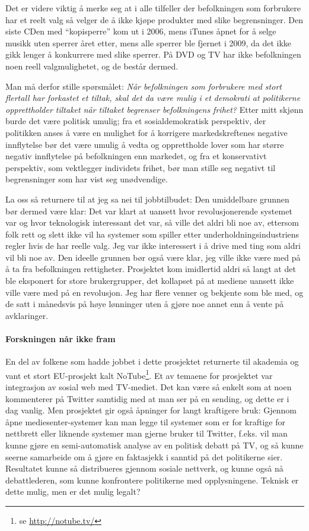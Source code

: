 \documentclass[11pt,norsk,a4paper]{article}
\begin{document}
Det er videre viktig å merke seg at i alle tilfeller der befolkningen
som forbrukere har et reelt valg så velger de å ikke kjøpe produkter
med slike begrensninger. Den siste CDen med ``kopisperre'' kom ut i
2006\cite{aftkopi}, mens iTunes åpnet for å selge musikk uten sperrer året etter,
mens alle sperrer ble fjernet i 2009\cite{ituneskopi}, da det ikke gikk lenger å
konkurrere med slike sperrer. På DVD og TV har
ikke befolkningen noen reell valgmulighetet, og de består dermed.

Man må derfor stille spørsmålet: \emph{Når befolkningen som forbrukere med
stort flertall har forkastet et tiltak, skal det da være mulig i et
demokrati at politikerne opprettholder tiltaket når tiltaket begrenser
befolkningens frihet?} Etter mitt skjønn burde det være politisk
umulig; fra et sosialdemokratisk perspektiv, der politikken anses å
være en mulighet for å korrigere markedskreftenes negative innflytelse
bør det være umulig å vedta og opprettholde lover som har større
negativ innflytelse på befolkningen enn markedet, og fra et
konservativt perspektiv, som vektlegger individets frihet, bør man
stille seg negativt til begrensninger som har vist seg unødvendige.

La oss så returnere til at jeg sa nei til jobbtilbudet: Den
umiddelbare grunnen bør dermed være klar: Det var klart at uansett
hvor revolusjonerende systemet var og hvor teknologisk interessant det
var, så ville det aldri bli noe av, ettersom folk rett og slett ikke
vil ha systemer som spiller etter underholdningsindustriens regler
hvis de har reelle valg. Jeg var ikke interessert i å drive med ting
som aldri vil bli noe av. Den ideelle grunnen bør også være klar, jeg
ville ikke være med på å ta fra befolkningen rettigheter. Prosjektet
kom imidlertid aldri så langt at det ble eksponert for store
brukergrupper, det kollapset på at mediene uansett ikke ville være med
på en revolusjon. Jeg har flere venner og bekjente som ble med, og de
satt i månedsvis på høye lønninger uten å gjøre noe annet enn å vente
på avklaringer.

\paragraph{Forskningen når ikke fram}

En del av folkene som hadde jobbet i dette prosjektet returnerte til
akademia og vant et stort EU-prosjekt kalt
NoTube\footnote{se \url{http://notube.tv/}}. Et av temaene for
prosjektet var integrasjon av sosial web med TV-mediet. Det kan være
så enkelt som at noen kommenterer på Twitter samtidig med at man ser
på en sending, og dette er i dag vanlig. Men prosjektet gir også
åpninger for langt kraftigere bruk: Gjennom åpne mediesenter-systemer
kan man legge til systemer som er for kraftige for nettbrett eller
liknende systemer man gjerne bruker til Twitter, f.eks. vil man kunne
gjøre en semi-automatisk analyse av en politisk debatt på TV, og så
kunne seerne samarbeide om å gjøre en faktasjekk i sanntid på det
politikerne sier. Resultatet kunne så distribueres gjennom sosiale
nettverk, og kunne også nå debattlederen, som kunne konfrontere
politikerne med opplysningene. Teknisk er dette mulig, men er det
mulig legalt?
\end{document}
